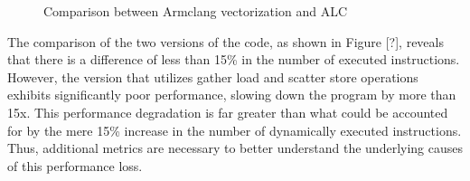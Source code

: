 \documentclass[\main/thesis.tex]{subfiles}
\begin{document}
\begin{figure}%
    \centering
    \qquad
    \caption{Comparison between Armclang vectorization and ALC}%
    \label{fig:example}%
\end{figure}

The comparison of the two versions of the code, as shown in Figure [?], reveals that there is a difference of less than 15\% in the number of executed instructions. However, the version that utilizes gather load and scatter store operations exhibits significantly poor performance, slowing down the program by more than 15x. This performance degradation is far greater than what could be accounted for by the mere 15\% increase in the number of dynamically executed instructions. Thus, additional metrics are necessary to better understand the underlying causes of this performance loss.
\end{document}
